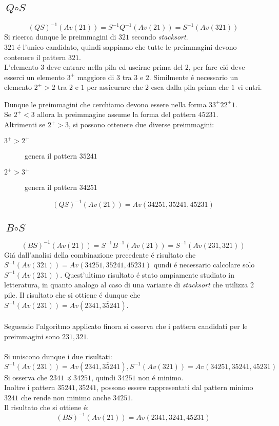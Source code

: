 \subsection*{$\textit{Q}\circ\textit{S}$}$$(QS)^{-1}(Av(21))=S^{-1}Q^{-1}(Av(21))=S^{-1}(Av(321))$$
Si ricerca dunque le preimmagini di $321$ secondo \textit{stacksort}.\\$321$ \'e l'unico candidato, quindi sappiamo che tutte le preimmagini devono contenere il pattern $321$.\\
L'elemento $3$ deve entrare nella pila ed uscirne prima del $2$, per fare ci\'o deve esserci un elemento $3^+$ maggiore di $3$ tra $3$ e $2$. Similmente \'e necessario un elemento $2^+>2$ tra $2$ e $1$ per assicurare che $2$ esca dalla pila prima che $1$ vi entri.\\
\begin{center}
\end{center}
Dunque le preimmagini che cerchiamo devono essere nella forma $33^+22^+1$.\\
Se $2^+<3$ allora la preimmagine assume la forma del pattern $45231$.\\
Altrimenti se $2^+>3$, si possono ottenere due diverse preimmagini:
\begin{description}
	\item[$3^+>2^+$] genera il pattern $35241$
	\item[$2^+>3^+$] genera il pattern $34251$
\end{description}
$$(QS)^{-1}(Av(21)) = Av(34251, 35241, 45231)$$
\subsection*{$\textit{B}\circ\textit{S}$}$$(BS)^{-1}(Av(21))=S^{-1}B^{-1}(Av(21))=S^{-1}(Av(231,321))$$
Gi\'a dall'analisi della combinazione precedente \'e risultato che $S^{-1}(Av(321))=Av(34251, 35241, 45231)$ qundi \'e necessario calcolare solo $S^{-1}(Av(231))$. Quest'ultimo risultato \'e stato ampiamente studiato in letteratura, in quanto analogo al caso di una variante di \textit{stacksort} che utilizza 2 pile. Il risultato che si ottiene \'e dunque che $S^{-1}(Av(231))=Av(2341, 3\overline{5}241)$\cite{claesson2012sorting}.\\\\
Seguendo l'algoritmo applicato finora si osserva che i pattern candidati per le preimmagini sono $231,321$.\\\\
Si uniscono dunque i due risultati:
$$S^{-1}(Av(231))=Av(2341,3\overline{5}241), S^{-1}(Av(321))=Av(34251, 35241, 45231)$$
Si osserva che $2341\preceq 34251$, quindi $34251$ non \'e minimo.\\
Inoltre i pattern $35241, 3\overline{5}241$, possono essere rappresentati dal pattern minimo $3241$ che rende non minimo anche $34251$.\\Il risultato che si ottiene \'e:$$(BS)^{-1}(Av(21))=Av(2341,3241,45231)$$
